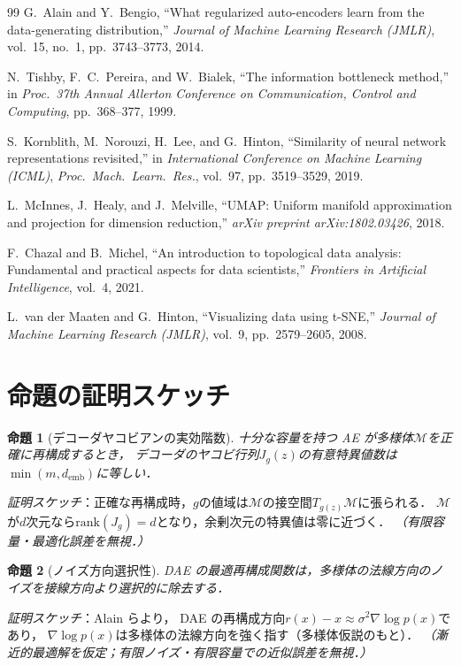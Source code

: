 \documentclass[11pt,a4paper]{jsarticle}
\newtheorem{proposition}{命題}
\newcommand{\Jg}{J_g}
\newcommand{\demb}{d_{\mathrm{emb}}}
\begin{document}
\begin{thebibliography}{99}
G.~Alain and Y.~Bengio,
``What regularized auto-encoders learn from the data-generating distribution,''
\textit{Journal of Machine Learning Research (JMLR)}, vol.~15, no.~1,
pp.~3743--3773, 2014.

N.~Tishby, F.~C.~Pereira, and W.~Bialek,
``The information bottleneck method,''
in \textit{Proc.~37th Annual Allerton Conference on Communication, Control and Computing},
pp.~368--377, 1999.

S.~Kornblith, M.~Norouzi, H.~Lee, and G.~Hinton,
``Similarity of neural network representations revisited,''
in \textit{International Conference on Machine Learning (ICML)},
\textit{Proc.~Mach.~Learn.~Res.}, vol.~97, pp.~3519--3529, 2019.

L.~McInnes, J.~Healy, and J.~Melville,
``UMAP: Uniform manifold approximation and projection for dimension reduction,''
\textit{arXiv preprint arXiv:1802.03426}, 2018.

F.~Chazal and B.~Michel,
``An introduction to topological data analysis: Fundamental and practical aspects
for data scientists,''
\textit{Frontiers in Artificial Intelligence}, vol.~4, 2021.

L.~van der Maaten and G.~Hinton,
``Visualizing data using t-SNE,''
\textit{Journal of Machine Learning Research (JMLR)}, vol.~9,
pp.~2579--2605, 2008.

\end{thebibliography}

\appendix

\section{命題の証明スケッチ}\label{app:proofs}

\begin{proposition}[デコーダヤコビアンの実効階数]\label{thm:rank}
十分な容量を持つ AE が多様体$\mathcal{M}$を正確に再構成するとき，
デコーダのヤコビ行列$\Jg(z)$の有意特異値数は$\min(m, \demb)$に等しい．
\end{proposition}
\textit{証明スケッチ}：正確な再構成時，$g$の値域は$\mathcal{M}$の接空間$T_{g(z)}\mathcal{M}$に張られる．
$\mathcal{M}$が$d$次元なら$\mathrm{rank}(\Jg) = d$となり，余剰次元の特異値は零に近づく．
\textit{（有限容量・最適化誤差を無視．）}

\begin{proposition}[ノイズ方向選択性]\label{thm:nsr}
DAE の最適再構成関数は，多様体の法線方向のノイズを接線方向より選択的に除去する．
\end{proposition}
\textit{証明スケッチ}：Alain ら\cite{alain2014dae}より，
DAE の再構成方向$r(x) - x \approx \sigma^2 \nabla\log p(x)$であり，
$\nabla\log p(x)$は多様体の法線方向を強く指す（多様体仮説のもと）．
\textit{（漸近的最適解を仮定；有限ノイズ・有限容量での近似誤差を無視．）}
\end{document}
